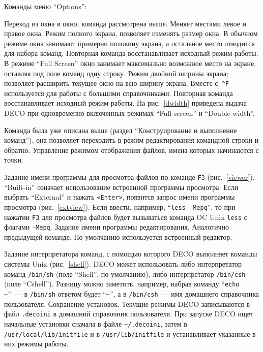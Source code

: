 Команды меню ``Options'':
\begin{example}
Переход из окна в окно, команда рассмотрена выше.
Меняет местами левое и правое окна.
Режим полного экрана, позволяет изменять размер окна.
В обычном режиме окна занимают
примерно половину экрана,
а остальное место отводится для набора команд.
Повторная команда восстанавливает
исходный режим работы.
В режиме ``Full Screen'' окно занимает максимально возможное место
на экране, оставляя под поле команд одну строку.
Режим двойной ширины экрана; позволяет расширить текущее окно
на всю ширину экрана.
Вместе с~{\tt \^{}F} используется для работы с большими справочниками.
Повторная команда восстанавливает исходный режим работы.
На рис.~\ref{dwidth} приведена выдача DECO
при одновременно включенных режимах ``Full screen'' и ``Double width''.


Команда была уже описана выше (раздел ``Конструирование и
выполнение команд''), она позволяет переходить в режим редактирования
командной строки и обратно.
Управление режимом отображения файлов, имена которых
начинаются с точки.



Задание имени программы для просмотра файлов по команде {\tt F3}
(рис.~\ref{viewer}).
``Built-in'' означает использование встроенной программы
просмотра. Если выбрать ``External'' и нажать {\tt <Enter>},
появится запрос имени программы просмотра (рис.~\ref{extview}).
Если ввести, например, ``{\tt less -Mepq}'', то при нажатии {\tt F3}
для просмотра файлов будет вызываться команда OC Unix {\tt less}
с флагами {\tt -Mepq}.
Задание имени программы редактирования. Аналогично
предыдущей команде. По умолчанию используется встроенный
редактор.


Задание интерпретатора команд, с помощью которого
DECO выполняет команды системы Unix (рис.~\ref{shell}).
DECO может использовать либо интерпретатор команд {\tt /bin/sh}
(поле ``Shell'', по умолчанию),
либо интерпретатор {\tt /bin/csh} (поле ``Cshell'').
Разницу можно заметить, например,
набрав команду ``{\tt echo \~{}}''~--- в {\tt /bin/sh} ответом
будет ``{\tt \~{}}'', а в {\tt /bin/csh}~--- имя домашнего справочника
пользователя.
Сохранение установок. Текущие режимы DECO записываются
в файл {\tt .decoini} в домашний
справочник пользователя. При запуске DECO ищет начальные
установки сначала в файле {\tt \~{}/.decoini},
затем в {\tt /usr/local/lib/initfile} и в {\tt /usr/lib/initfile}
и устанавливает указанные в них режимы работы.
\end{example}

